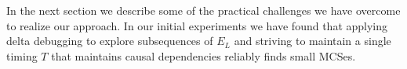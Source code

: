 In the next section we describe some
of the practical challenges we have overcome to realize our approach.
In our initial experiments we have found that applying delta debugging to explore
subsequences of $E_L$ and striving to maintain a single timing $T$ that maintains
causal dependencies reliably finds small MCSes.
